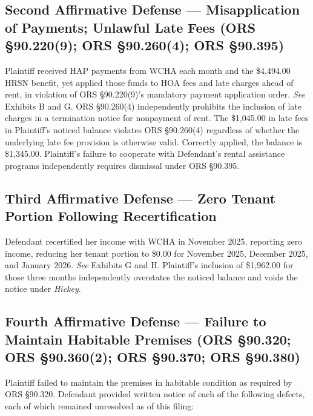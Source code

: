 \documentclass[12pt,letterpaper]{article}
\begin{document}
	\subsection{Second Affirmative Defense --- Misapplication of Payments; Unlawful Late Fees (ORS \S90.220(9); ORS \S90.260(4); ORS \S90.395)}
	
	Plaintiff received HAP payments from WCHA each month and the \$4,494.00 HRSN benefit, yet applied those funds to HOA fees and late charges ahead of rent, in violation of ORS \S90.220(9)'s mandatory payment application order. \textit{See} Exhibits B and G. ORS \S90.260(4) independently prohibits the inclusion of late charges in a termination notice for nonpayment of rent. The \$1,045.00 in late fees in Plaintiff's noticed balance violates ORS \S90.260(4) regardless of whether the underlying late fee provision is otherwise valid. Correctly applied, the balance is \$1,345.00. Plaintiff's failure to cooperate with Defendant's rental assistance programs independently requires dismissal under ORS \S90.395.
	
	\subsection{Third Affirmative Defense --- Zero Tenant Portion Following Recertification}
	
	Defendant recertified her income with WCHA in November 2025, reporting zero income, reducing her tenant portion to \$0.00 for November 2025, December 2025, and January 2026. \textit{See} Exhibits G and H. Plaintiff's inclusion of \$1,962.00 for those three months independently overstates the noticed balance and voids the notice under \textit{Hickey}.
	
	\subsection{Fourth Affirmative Defense --- Failure to Maintain Habitable Premises (ORS \S90.320; ORS \S90.360(2); ORS \S90.370; ORS \S90.380)}
	
	Plaintiff failed to maintain the premises in habitable condition as required by ORS \S90.320. Defendant provided written notice of each of the following defects, each of which remained unresolved as of this filing:
	
\end{document}
